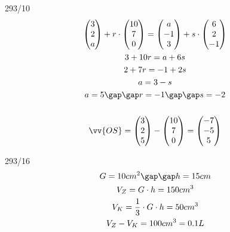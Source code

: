 \begin{exercise}{293/10}
\begin{gather*}
    \begin{pmatrix}3 \\ 2 \\ a\end{pmatrix} + r \cdot \begin{pmatrix}10 \\ 7 \\ 0\end{pmatrix} = \begin{pmatrix}a \\ -1 \\ 3\end{pmatrix} + s \cdot \begin{pmatrix}6 \\ 2 \\ -1\end{pmatrix} \\
    3 + 10r = a + 6s \\
    2 + 7r = -1 + 2s \\
    a = 3 - s \\
    a = 5 \gap\gap r = -1 \gap\gap s = -2 \\\\
    \vv{OS} = \begin{pmatrix}3 \\ 2 \\ 5\end{pmatrix} - \begin{pmatrix}10 \\ 7 \\ 0\end{pmatrix} = \begin{pmatrix}-7 \\ -5 \\ 5\end{pmatrix}
  \end{gather*}
\end{exercise}
\begin{exercise}{293/16}
  \begin{gather*}
    G = 10cm^2 \gap\gap h = 15cm \\
    V_Z = G \cdot h = 150cm^3 \\
    V_K = \frac{1}{3} \cdot G \cdot h = 50cm^3 \\
    V_Z - V_K = 100cm^3 = 0.1L
  \end{gather*}
\end{exercise}
